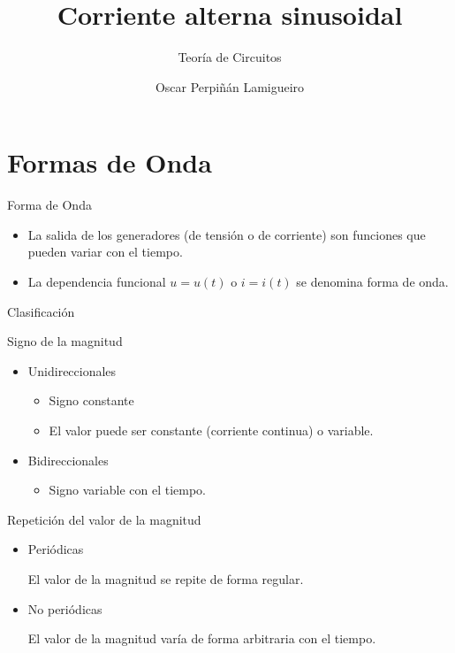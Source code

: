 \documentclass[aspectratio=169, usenames,svgnames,dvipsnames]{beamer}
\author{Oscar Perpiñán Lamigueiro}
\date{}
\title{Corriente alterna sinusoidal}
\subtitle{Teoría de Circuitos}
\begin{document}
\maketitle

\section{Formas de Onda}
\label{sec:org5b89292}

\begin{frame}[label={sec:org043b50b}]{Forma de Onda}
\begin{itemize}
\item La salida de los generadores (de tensión o de corriente) son funciones que pueden variar con el tiempo.
\item La dependencia funcional \(u = u(t)\) o \(i = i(t)\) se denomina forma de onda.
\end{itemize}
\end{frame}
\begin{frame}[label={sec:org87a46cd}]{Clasificación}
\begin{block}{Signo de la magnitud}
\begin{itemize}
\item Unidireccionales
\begin{itemize}
\item Signo constante
\item El valor puede ser constante (corriente continua) o variable.
\end{itemize}
\item Bidireccionales
\begin{itemize}
\item Signo variable con el tiempo.
\end{itemize}
\end{itemize}
\end{block}
\begin{block}{Repetición del valor de la magnitud}
\begin{itemize}
\item Periódicas

El valor de la magnitud se repite de forma regular.

\item No periódicas

El valor de la magnitud varía de forma arbitraria con el tiempo.
\end{itemize}
\end{block}
\end{frame}
\end{document}

